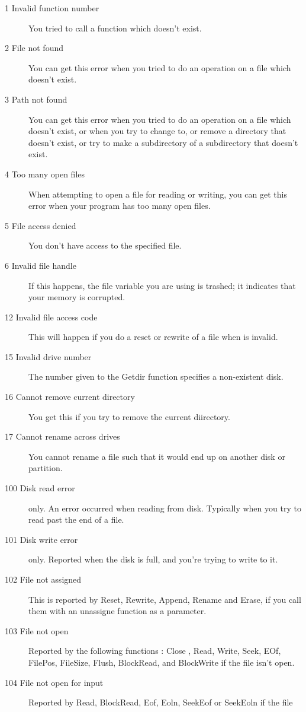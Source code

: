 \documentclass{book}
\begin{document}
\begin{description}
\item [1  Invalid function number]
You tried to call a \dos function which doesn't exist.
\item [2  File not found]
You can get this error when you tried to do an operation on a file which
doesn't exist.
\item [3  Path not found]
You can get this error when you tried to do an operation on a file which
doesn't exist, or when you try to change to, or remove a directory that doesn't exist,
or try to make a subdirectory  of a subdirectory that doesn't exist.
\item [4  Too many open files]
When attempting to open a file for reading or writing, you can get this
error when your program has too many open files.
\item [5  File access denied]
You don't have access to the specified file.
\item [6  Invalid file handle]
If this happens, the file variable you are using is trashed; it
indicates that your memory is corrupted.
\item [12  Invalid file access code]
This will happen if you do a reset or rewrite of a file when 
is invalid.
\item [15  Invalid drive number]
The number given to the Getdir function specifies a non-existent disk.
\item [16  Cannot remove current directory]
You get this if you try to remove the current diirectory.
\item [17  Cannot rename across drives]
You cannot rename a file such that it would end up on another disk or
partition.
\item [100  Disk read error]
\dos only. An error occurred when reading from disk. Typically when you try
to read past the end of a file.
\item [101  Disk write error]
\dos only. Reported when the disk is full, and you're trying to write to it.
\item [102  File not assigned]
This is reported by Reset, Rewrite, Append, Rename and Erase, if you call
them with an unassigne function as a parameter.
\item [103  File not open]
Reported by the following functions : Close , Read, Write, Seek,
EOf, FilePos, FileSize, Flush, BlockRead, and BlockWrite if the file isn't
open.
\item [104  File not open for input]
Reported by Read, BlockRead, Eof, Eoln, SeekEof or SeekEoln if the file

\end{description}
\end{document}
